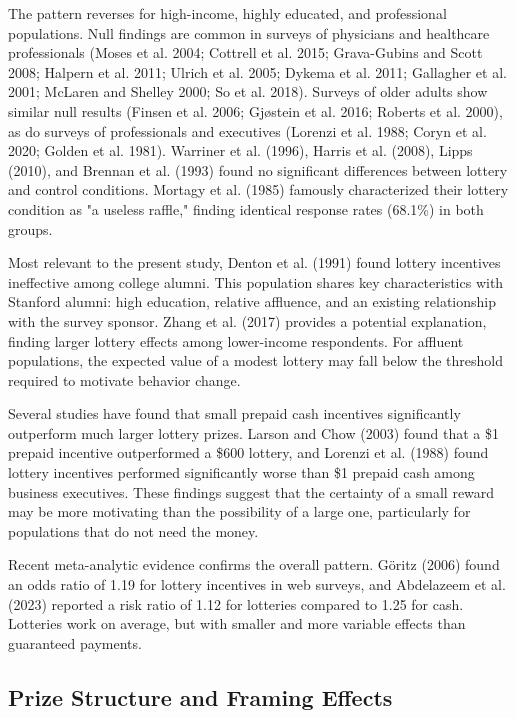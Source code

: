 \documentclass[12pt]{article}
\begin{document}
The pattern reverses for high-income, highly educated, and professional populations. Null findings are common in surveys of physicians and healthcare professionals (Moses et al. 2004; Cottrell et al. 2015; Grava-Gubins and Scott 2008; Halpern et al. 2011; Ulrich et al. 2005; Dykema et al. 2011; Gallagher et al. 2001; McLaren and Shelley 2000; So et al. 2018). Surveys of older adults show similar null results (Finsen et al. 2006; Gjøstein et al. 2016; Roberts et al. 2000), as do surveys of professionals and executives (Lorenzi et al. 1988; Coryn et al. 2020; Golden et al. 1981). Warriner et al. (1996), Harris et al. (2008), Lipps (2010), and Brennan et al. (1993) found no significant differences between lottery and control conditions. Mortagy et al. (1985) famously characterized their lottery condition as "a useless raffle," finding identical response rates (68.1\%) in both groups.

Most relevant to the present study, Denton et al. (1991) found lottery incentives ineffective among college alumni. This population shares key characteristics with Stanford alumni: high education, relative affluence, and an existing relationship with the survey sponsor. Zhang et al. (2017) provides a potential explanation, finding larger lottery effects among lower-income respondents. For affluent populations, the expected value of a modest lottery may fall below the threshold required to motivate behavior change.

Several studies have found that small prepaid cash incentives significantly outperform much larger lottery prizes. Larson and Chow (2003) found that a \$1 prepaid incentive outperformed a \$600 lottery, and Lorenzi et al. (1988) found lottery incentives performed significantly worse than \$1 prepaid cash among business executives. These findings suggest that the certainty of a small reward may be more motivating than the possibility of a large one, particularly for populations that do not need the money.

Recent meta-analytic evidence confirms the overall pattern. Göritz (2006) found an odds ratio of 1.19 for lottery incentives in web surveys, and Abdelazeem et al. (2023) reported a risk ratio of 1.12 for lotteries compared to 1.25 for cash. Lotteries work on average, but with smaller and more variable effects than guaranteed payments.

\subsection{Prize Structure and Framing Effects}
\end{document}
